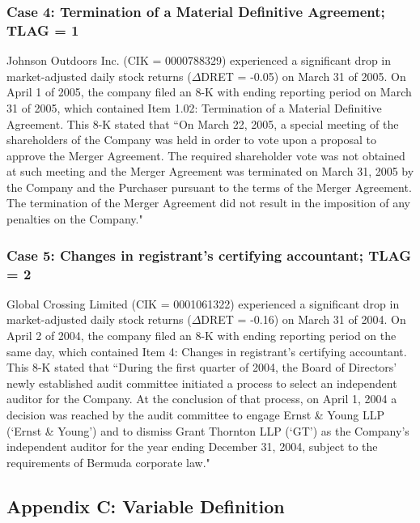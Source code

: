\subsubsection*{Case 4: Termination of a Material Definitive Agreement; TLAG = 1}
Johnson Outdoors Inc. (CIK = 0000788329) experienced a significant drop in market-adjusted daily stock returns ($\Delta$DRET = -0.05) on March 31 of 2005. On April 1 of 2005, the company filed an 8-K with ending reporting period on March 31 of 2005, which contained Item 1.02: Termination of a Material Definitive Agreement. This 8-K stated that ``On March 22, 2005, a special meeting of the shareholders of the Company was held in order to vote upon a proposal to approve the Merger Agreement. The required shareholder vote was not obtained at such meeting and the Merger Agreement was terminated on March 31, 2005 by the Company and the Purchaser pursuant to the terms of the Merger Agreement. The termination of the Merger Agreement did not result in the imposition of any penalties on the Company."
\subsubsection*{Case 5: Changes in registrant's certifying accountant; TLAG = 2}
Global Crossing Limited (CIK = 0001061322) experienced a significant drop in market-adjusted daily stock returns ($\Delta$DRET = -0.16) on March 31 of 2004. On April 2 of 2004, the company filed an 8-K with ending reporting period on the same day, which contained Item 4: Changes in registrant's certifying accountant. This 8-K stated that ``During the first quarter of 2004, the Board of Directors’ newly established audit committee initiated a process to select an independent auditor for the Company. At the conclusion of that process, on April 1, 2004 a decision was reached by the audit committee to engage Ernst \& Young LLP (`Ernst \& Young') and to dismiss Grant Thornton LLP (`GT') as the Company’s independent auditor for the year ending December 31, 2004, subject to the requirements of Bermuda corporate law."

\newpage

\subsection*{Appendix C: Variable Definition}
\label{appc}
